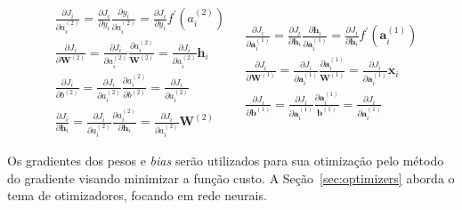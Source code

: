 \begin{subequations} \label{eq:nn-backprop}
\begin{align}
    &\frac{\partial{J_i}}{\partial{a_i^{(2)}}}
        = \frac{\partial{J_i}}{\partial{y_i}} \frac{\partial{y_i}}{\partial{a_i^{(2)}}}
        = \frac{\partial{J_i}}{\partial{y_i}} f^{\prime}(a_i^{(2)}) \label{eq:nn-backprop-a2}\\
    &\frac{\partial{J_i}}{\partial{\mathbf{W}^{(2)}}}
        = \frac{\partial{J_i}}{\partial{a_i^{(2)}}} \frac{\partial{a_i^{(2)}}}{\mathbf{W}^{(2)}}
        = \frac{\partial{J_i}}{\partial{a_i^{(2)}}} \mathbf{h}_i \label{eq:nn-backprop-w2}\\
    &\frac{\partial{J_i}}{\partial{b^{(2)}}}
        = \frac{\partial{J_i}}{\partial{a_i^{(2)}}} \frac{\partial{a_i^{(2)}}}{\partial{b^{(2)}}}
        = \frac{\partial{J_i}}{\partial{a_i^{(2)}}} \label{eq:nn-backprop-b2}\\
    &\frac{\partial{J_i}}{\partial{\mathbf{h}_i}}
        = \frac{\partial{J_i}}{\partial{a_i^{(2)}}} \frac{\partial{a_i^{(2)}}}{\partial{\mathbf{h}_i}}
        = \frac{\partial{J_i}}{\partial{a_i^{(2)}}} \mathbf{W}^{(2)} \label{eq:nn-backprop-h}
\end{align}

\begin{align}
    &\frac{\partial{J_i}}{\partial{\mathbf{a}_i^{(1)}}}
        = \frac{\partial{J_i}}{\partial{\mathbf{h}_i}} \frac{\partial{\mathbf{h}_i}}{\partial{\mathbf{a}_i^{(1)}}}
        = \frac{\partial{J_i}}{\partial{\mathbf{h}_i}} f^{\prime}(\mathbf{a}_i^{(1)})\\
    &\frac{\partial{J_i}}{\partial{\mathbf{W}^{(1)}}}
        = \frac{\partial{J_i}}{\partial{\mathbf{a}_i^{(1)}}} \frac{\partial{\mathbf{a}_i^{(1)}}}{\mathbf{W}^{(1)}}
        = \frac{\partial{J_i}}{\partial{\mathbf{a}_i^{(1)}}} \mathbf{x}_i \label{eq:nn-backprop-w1}\\
    &\frac{\partial{J_i}}{\partial{\mathbf{b}^{(1)}}}
        = \frac{\partial{J_i}}{\partial{\mathbf{a}_i^{(1)}}} \frac{\partial{\mathbf{a}_i^{(1)}}}{\mathbf{b}^{(1)}}
        = \frac{\partial{J_i}}{\partial{\mathbf{a}_i^{(1)}}} \label{eq:nn-backprop-b1}
\end{align}
\end{subequations}

Os gradientes dos pesos e \textit{bias} serão utilizados para sua otimização pelo método do gradiente visando minimizar
a função custo.
A Seção~\ref{sec:optimizers} aborda o tema de otimizadores, focando em rede neurais.


